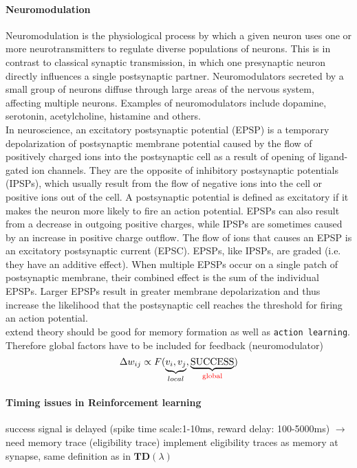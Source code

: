 \documentclass[11pt]{article}
\begin{document}
\paragraph{Neuromodulation}
Neuromodulation is the physiological process by which a given neuron uses one or more neurotransmitters to regulate diverse populations of neurons. This is in contrast to classical synaptic transmission, in which one presynaptic neuron directly influences a single postsynaptic partner. Neuromodulators secreted by a small group of neurons diffuse through large areas of the nervous system, affecting multiple neurons. Examples of neuromodulators include dopamine, serotonin, acetylcholine, histamine and others.\\
In neuroscience, an excitatory postsynaptic potential (EPSP) is a temporary depolarization of postsynaptic membrane potential caused by the flow of positively charged ions into the postsynaptic cell as a result of opening of ligand-gated ion channels. They are the opposite of inhibitory postsynaptic potentials (IPSPs), which usually result from the flow of negative ions into the cell or positive ions out of the cell. A postsynaptic potential is defined as excitatory if it makes the neuron more likely to fire an action potential. EPSPs can also result from a decrease in outgoing positive charges, while IPSPs are sometimes caused by an increase in positive charge outflow. The flow of ions that causes an EPSP is an excitatory postsynaptic current (EPSC).
EPSPs, like IPSPs, are graded (i.e. they have an additive effect). When multiple EPSPs occur on a single patch of postsynaptic membrane, their combined effect is the sum of the individual EPSPs. Larger EPSPs result in greater membrane depolarization and thus increase the likelihood that the postsynaptic cell reaches the threshold for firing an action potential.\\

extend theory
should be good for memory formation as well as \texttt{action learning}. Therefore global factors have to be included for feedback (neuromodulator)
\[
\Delta w_{ij} \propto F(\underbrace{v_i,v_j}_{local},\underbrace{\text{SUCCESS}}_{\text{\textcolor{red}{global}}})
\]

\paragraph{Timing issues in Reinforcement learning}
success signal is delayed (spike time scale:1-10ms, reward delay: 100-5000ms) $\rightarrow$ need memory trace (eligibility trace)
implement eligibility traces as memory at synapse, same definition as in $\mathbf{TD}(\lambda)$
\end{document}
